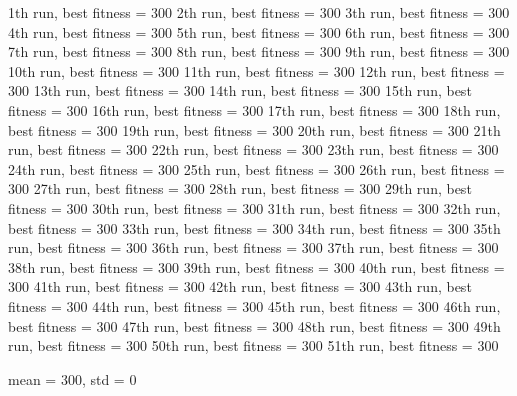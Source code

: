 1th run, best fitness = 300
2th run, best fitness = 300
3th run, best fitness = 300
4th run, best fitness = 300
5th run, best fitness = 300
6th run, best fitness = 300
7th run, best fitness = 300
8th run, best fitness = 300
9th run, best fitness = 300
10th run, best fitness = 300
11th run, best fitness = 300
12th run, best fitness = 300
13th run, best fitness = 300
14th run, best fitness = 300
15th run, best fitness = 300
16th run, best fitness = 300
17th run, best fitness = 300
18th run, best fitness = 300
19th run, best fitness = 300
20th run, best fitness = 300
21th run, best fitness = 300
22th run, best fitness = 300
23th run, best fitness = 300
24th run, best fitness = 300
25th run, best fitness = 300
26th run, best fitness = 300
27th run, best fitness = 300
28th run, best fitness = 300
29th run, best fitness = 300
30th run, best fitness = 300
31th run, best fitness = 300
32th run, best fitness = 300
33th run, best fitness = 300
34th run, best fitness = 300
35th run, best fitness = 300
36th run, best fitness = 300
37th run, best fitness = 300
38th run, best fitness = 300
39th run, best fitness = 300
40th run, best fitness = 300
41th run, best fitness = 300
42th run, best fitness = 300
43th run, best fitness = 300
44th run, best fitness = 300
45th run, best fitness = 300
46th run, best fitness = 300
47th run, best fitness = 300
48th run, best fitness = 300
49th run, best fitness = 300
50th run, best fitness = 300
51th run, best fitness = 300

mean = 300, std = 0
